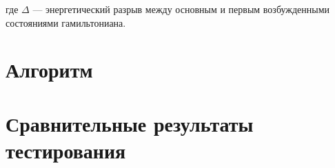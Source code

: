 \documentclass[a4paper]{report}
\begin{document}
где $\Delta$ — энергетический разрыв между основным и первым возбужденными состояниями гамильтониана.


\section{Алгоритм}


\section{Сравнительные результаты тестирования}

\end{document}
